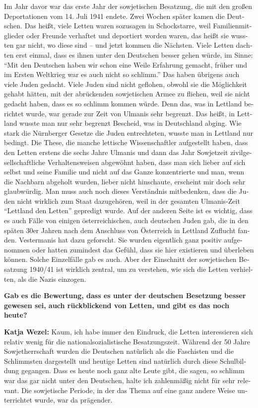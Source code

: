 \begin{otherlanguage}{ngerman}
Im Jahr davor war das erste Jahr der sowjetischen Besatzung, die mit den großen Deportationen vom 14. Juli 1941 endete. Zwei Wochen später kamen die Deutschen. Das heißt, viele Letten waren sozusagen in Schockstarre, weil Familienmitglieder oder Freunde verhaftet und deportiert worden waren, das heißt sie wussten gar nicht, wo diese sind – und jetzt kommen die Nächsten. Viele Letten dachten erst einmal, dass es ihnen unter den Deutschen besser gehen würde, im Sinne: ``Mit den Deutschen haben wir schon eine Weile Erfahrung gemacht, früher und im Ersten Weltkrieg war es auch nicht so schlimm.'' Das haben übrigens auch viele Juden gedacht. Viele Juden sind nicht geflohen, obwohl sie die Möglichkeit gehabt hätten, mit der abrückenden sowjetischen Armee zu fliehen, weil sie nicht gedacht haben, dass es so schlimm kommen würde. Denn das, was in Lettland berichtet wurde, war gerade zur Zeit von Ulmanis sehr begrenzt. Das heißt, in Lettland wusste man nur sehr begrenzt Bescheid, was in Deutschland abging. Wie stark die Nürnberger Gesetze die Juden entrechteten, wusste man in Lettland nur bedingt. Die These, die manche lettische Wissenschaftler aufgestellt haben, dass den Letten erstens die sechs Jahre Ulmanis und dann das Jahr Sowjetzeit zivilgesellschaftliche Verhaltensweisen abgewöhnt haben, dass man sich lieber auf sich selbst und seine Familie und nicht auf das Ganze konzentrierte und man, wenn die Nachbarn abgeholt wurden, lieber nicht hinschaute, erscheint mir doch sehr glaubwürdig. Man muss auch noch dieses Verständnis mitbedenken, dass die Juden nicht wirklich zum Staat dazugehören, weil in der gesamten Ulmanis-Zeit ``Lettland den Letten'' gepredigt wurde. Auf der anderen Seite ist es wichtig, dass es auch Fälle von einigen österreichischen, auch deutschen Juden gab, die in den späten 30er Jahren nach dem Anschluss von Österreich in Lettland Zuflucht fanden. Vestermanis hat dazu geforscht. Sie wurden eigentlich ganz positiv aufgenommen oder hatten zumindest das Gefühl, dass sie hier existieren und überleben können. Solche Einzelfälle gab es auch. Aber der Einschnitt der sowjetischen Besatzung 1940/41 ist wirklich zentral, um zu verstehen, wie sich die Letten verhielten, als die Nazis einzogen. 

\textbf{Gab es die Bewertung, dass es unter der deutschen Besetzung besser gewesen sei, auch rückblickend von Letten, und gibt es das noch heute?} 

\textbf{Katja Wezel:} Kaum, ich habe immer den Eindruck, die Letten interessieren sich relativ wenig für die nationalsozialistische Besatzungszeit. Während der 50 Jahre Sowjetherrschaft wurden die Deutschen natürlich als die Faschisten und die Schlimmsten dargestellt und heutige Letten sind natürlich durch diese Schulbildung gegangen. Dass es heute noch ganz alte Leute gibt, die sagen, so schlimm war das gar nicht unter den Deutschen, halte ich zahlenmäßig nicht für sehr relevant. Die sowjetische Periode, in der das Thema auf eine ganz andere Weise unterrichtet wurde, war da prägender. 


\end{otherlanguage}
